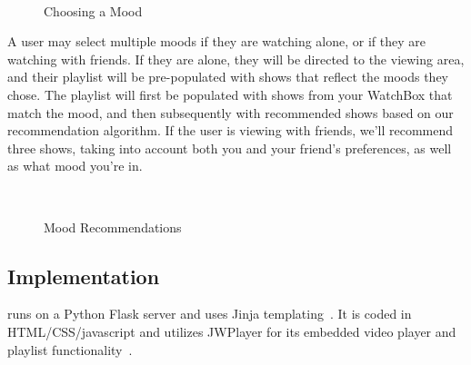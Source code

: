 \begin{figure}
\centering {}
           ~~
\caption{Choosing a Mood}
\label{fig:mood}
\end{figure}

A user may select multiple moods if they are watching alone, or if
they are watching with friends.  If they are alone, they will be
directed to the viewing area, and their playlist will be pre-populated
with shows that reflect the moods they chose.  The playlist will first
be populated with shows from your WatchBox that match the mood, and
then subsequently with recommended shows based on our recommendation
algorithm.  If the user is viewing with friends, we’ll recommend three
shows, taking into account both you and your friend’s preferences, as
well as what mood you’re in.

\begin{figure}
\centering {}
           ~~
\caption{Mood Recommendations}
\label{fig:moodrecommend}
\end{figure}

\subsection{Implementation}
{\sys} runs on a Python Flask server and uses Jinja
templating~\cite{flask,jinja}.  It is coded in HTML/CSS/javascript and utilizes JWPlayer
for its embedded video player and playlist functionality~\cite{jwplayer}.
